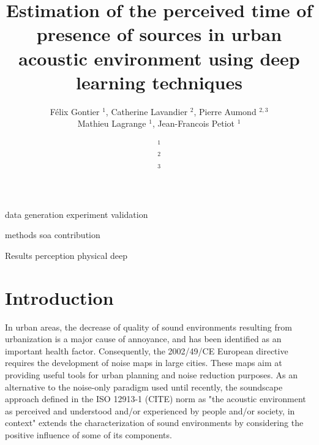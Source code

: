 \documentclass[11pt,a4paper]{article}
\begin{document}
\author{F\'elix Gontier $^1$, Catherine Lavandier $^2$, Pierre Aumond $^{2, 3}$\\Mathieu Lagrange $^1$, Jean-Francois Petiot $^1$}
\date{
$^1$\\
$^2$\\
$^3$
}
\title{Estimation of the perceived time of presence of sources in urban acoustic environment using deep learning techniques}
\maketitle


\begin{abstract}

\end{abstract}

data
  generation
  experiment
  validation

methods
  soa
  contribution

Results
  perception
  physical
  deep 

\section{Introduction}
\label{sec:intro}
In urban areas, the decrease of quality of sound environments resulting from urbanization is a major cause of annoyance, and has been identified as an important health factor. Consequently, the 2002/49/CE European directive requires the development of noise maps in large cities. These maps aim at providing useful tools for urban planning and noise reduction purposes. As an alternative to the noise-only paradigm used until recently, the soundscape approach defined in the ISO 12913-1 (CITE) norm as "the acoustic environment as perceived and understood and/or experienced by people and/or society, in context" extends the characterization of sound environments by considering the positive influence of some of its components.\\
\end{document}

